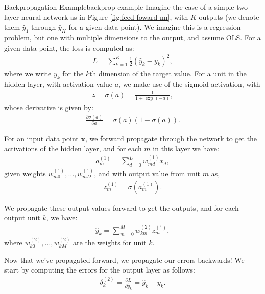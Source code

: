 \begin{example}{Backpropagation Example}{backprop-example}
  Imagine the case of a simple two layer neural network as in Figure \ref{fig:feed-foward-nn}, with $K$ outputs (we denote them $\hat{y}_1$ through $\hat{y}_K$ for a given data point). We imagine this is a regression problem, but one
  with multiple dimensions to the output, and assume OLS. For a given data point, the loss is computed as:
	\begin{align*}
		L = \sum_{k=1}^{K} \frac{1}{2}(\hat{y}_{k} - y_{k})^{2},
	\end{align*}
        where we write $y_k$ for the $k$th dimension of the target value.
%
        For a unit in the hidden layer, with activation value $a$, we make use of the sigmoid activation, with 
	\begin{align*}
z=		\sigma(a) = \frac{1}{1 + \exp{(-a)}},
	\end{align*}
	whose derivative is given by:
	\begin{align*}
		\frac{\partial \sigma(a)}{\partial a} = \sigma(a)(1 - \sigma(a)).
	\end{align*}
        
	For an input data point $\textbf{x}$, we forward propagate through the network to get the activations of the hidden layer, and for each $m$ in this layer we have:
	\begin{align*}
		a_{m}^{(1)} = \sum_{d=0}^{D} w^{(1)}_{md} x_{d},
	\end{align*}
    given weights $w^{(1)}_{m0},\ldots, w^{(1)}_{mD}$,   and  with output value from unit $m$ as, 
%
	\begin{align*}
		z^{(1)}_{m} = \sigma{(a^{(1)}_{m})}.
	\end{align*}
        
	We propagate these output values  forward to get the outputs, and for each output unit $k$, we have:
	\begin{align*}
		\hat{y}_{k} = \sum_{m=0}^{M} w_{km}^{(2)} z^{(1)}_{m},
	\end{align*}
where $w^{(2)}_{k0},\ldots,w^{(2)}_{kM}$ are the weights for unit $k$.
        
	Now that we've propagated forward, we propagate our errors backwards! We start by computing the errors for the output layer as follows:
	\begin{align*}
		\delta^{(2)}_{k} =  \frac{\partial L}{\partial \hat{y}_k}=\hat{y}_{k} - y_{k}.
	\end{align*}


\end{example}

